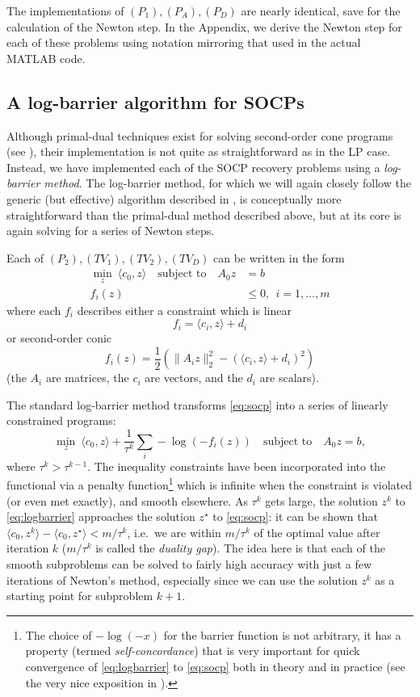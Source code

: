 \documentclass{article}
\newcommand{\<}{\langle}
\renewcommand{\>}{\rangle}
\begin{document}
The implementations of $(P_1),(P_A),(P_D)$ are nearly identical, save for the calculation of the Newton step.  In the Appendix, we derive the Newton step for each of these problems using notation mirroring that used in the actual MATLAB code.
  
\subsection{A log-barrier algorithm for SOCPs}
\label{sec:logbarrier}

Although primal-dual techniques exist for solving second-order cone programs 
(see \cite{alizadeh03se,lobo98ap}), their implementation is not quite as straightforward as in the LP case.  Instead, we have implemented each of the SOCP recovery problems using a {\em log-barrier method}.  The log-barrier method, for which we will again closely follow the generic (but effective) algorithm described in \cite[Chap. 11]{boyd04co}, is conceptually more straightforward than the primal-dual method  described above, but at its core is again solving for a series of Newton steps.

Each of $(P_2),(TV_1),(TV_2),(TV_D)$ can be written in the form
\begin{align}
\nonumber
\min_z~\<c_0,z\> \quad\text{subject~to}\quad A_0z & = b \\
\label{eq:socp}
f_i(z) &\leq 0,~~i=1,\ldots,m
\end{align}
where each $f_i$ describes either a constraint which is linear
\[
f_i = \<c_i,z\> + d_i
\]
or second-order conic
\[
f_i(z) = \frac{1}{2}\left(\|A_i z\|_2^2 - (\<c_i,z\> + d_i)^2\right)
\]
(the $A_i$ are matrices, the $c_i$ are vectors, and the $d_i$ are scalars). 


The standard log-barrier method transforms \eqref{eq:socp}
into a series of linearly constrained programs:
\begin{equation}
\label{eq:logbarrier} 
\min_z ~ \<c_0,z\> + \frac{1}{\tau^k} \sum_{i}
-\log(-f_i(z)) \quad\text{subject~to}\quad A_0 z=b,
\end{equation}
where $\tau^k > \tau^{k-1}$.  The inequality constraints have been incorporated into the functional via a penalty function\footnote{The choice of $-\log(-x)$ for the barrier function is not arbitrary, it has a property (termed {\em self-concordance}) that is very important for quick convergence of \eqref{eq:logbarrier} to \eqref{eq:socp} both in theory and in practice (see the very nice exposition in \cite{renegar01ma}).} 
which is infinite when the constraint is violated (or even met exactly), and smooth elsewhere.  As $\tau^k$ gets large, the solution $z^k$ to \eqref{eq:logbarrier} approaches the solution $z^\star$ to \eqref{eq:socp}: 
it can be shown that $\<c_0,z^k\> - \<c_0,z^\star\> < m/\tau^k$, i.e.\ we are within $m/\tau^k$ of the optimal value after iteration $k$ ($m/\tau^k$ is called the {\em duality gap}).
The idea here is that each of the smooth subproblems can be solved to fairly high accuracy with just a few iterations of Newton's method, especially
since we can use the solution $z^k$ as a starting point for subproblem $k+1$.
\end{document}
